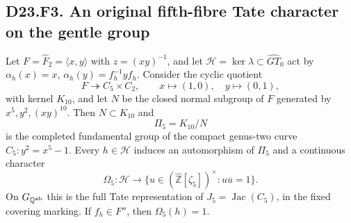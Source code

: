 
\subsection*{D23.F3. An original fifth-fibre Tate character on the gentle group}
Let $F=\widehat F_2=\langle x,y\rangle$ with $z=(xy)^{-1}$,
and let $\mathcal H=\ker\lambda\subset\widehat{GT}_0$ act by
$\alpha_h(x)=x$, $\alpha_h(y)=f_h^{-1}yf_h$.
Consider the cyclic quotient
\[
 F\twoheadrightarrow C_5\times C_2,
 \qquad x\mapsto(1,0),\quad y\mapsto(0,1),
\]
with kernel $K_{10}$, and let $N$ be the closed normal subgroup
of $F$ generated by $x^5,y^2,(xy)^{10}$.
Then $N\subset K_{10}$ and
\[
 \Pi_5=K_{10}/N
\]
is the completed fundamental group of the compact genus-two
curve $C_5:y^2=x^5-1$.  Every $h\in\mathcal H$ induces an
automorphism of $\Pi_5$ and a continuous character
\[
 \Omega_5:\mathcal H\longrightarrow
 \{u\in(\widehat{\mathbb Z}[\zeta_5])^\times:
                         u\overline u=1\}.
 \tag{D23.F3.1}
\]
On $G_{\mathbb Q^{\rm ab}}$ this is the full Tate representation
of $J_5=\operatorname{Jac}(C_5)$, in the fixed covering marking.
If $f_h\in F''$, then $\Omega_5(h)=1$.

